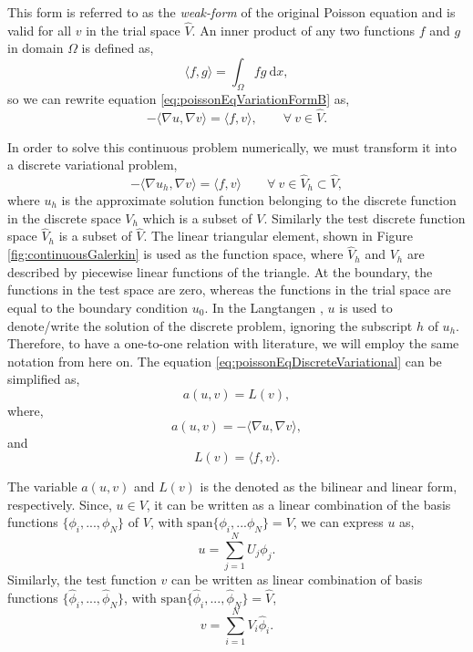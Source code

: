 This form is referred to as the \textit{weak-form} of the original Poisson equation and is valid for all $v$ in the trial space $\hat{V}$. An inner product of any two functions $f$ and $g$ in domain $\Omega$ is defined as,
	\begin{equation}
	\langle f,g \rangle = \int_{\Omega}fg\ \mathrm{d}x,
	\label{eq:innerProductRule}
	\end{equation}
so we can rewrite equation \ref{eq:poissonEqVariationFormB} as,
	\begin{equation}
	-\langle \nabla u,\nabla v \rangle = \langle f,v \rangle, \qquad \forall\ v \in \hat{V}.
	\end{equation}

In order to solve this continuous problem numerically, we must transform it into a discrete variational problem,
	\begin{equation}
	-\langle \nabla u_h, \nabla v \rangle = \langle f, v \rangle \qquad \forall\ v \in \hat{V}_h \subset \hat{V},
	\label{eq:poissonEqDiscreteVariational}
	\end{equation}
where $u_h$ is the approximate solution function belonging to the discrete function in the discrete space $V_h$ which is a subset of $V$. Similarly the test discrete function space $\hat{V}_h$ is a subset of $\hat{V}$. The linear triangular element, shown in Figure \ref{fig:continuousGalerkin} is used as the function space, where $\hat{V}_h$ and $V_h$ are described by piecewise linear functions of the triangle. At the boundary, the functions in the test space are zero, whereas the functions in the trial space are equal to the boundary condition $u_0$. In the Langtangen \cite{Logg2012b}, $u$ is used to denote/write the solution of the discrete problem, ignoring the subscript $h$ of $u_h$. Therefore, to have a one-to-one relation with literature, we will employ the same notation from here on. The equation \ref{eq:poissonEqDiscreteVariational} can be simplified as,
	\begin{equation}
	a\left(u,v\right) = L(v),
	\label{eq:weakForm}
	\end{equation}
where,
	\begin{equation}
	a\left(u,v\right) = - \langle \nabla u, \nabla v \rangle,
	\end{equation}
and
	\begin{equation}
	L(v) = \langle f,v \rangle.
	\end{equation}

The variable $a(u,v)$ and $L(v)$ is the denoted as the bilinear and linear form, respectively. Since, $u\in V$, it can be written as a linear combination of the basis functions $\{\phi_i,...,\phi_N\}$ of $V$, with $\mathrm{span}\{\phi_i,...\phi_N\}=V$, we can express $u$ as,
	\begin{equation}
	u = \sum_{j=1}^{N} U_j \phi_j.
	\label{eq:trialDiscrete}
	\end{equation}
Similarly, the test function $v$ can be written as linear combination of basis functions $\{\hat{\phi}_i,...,\hat{\phi}_N\}$, with $\mathrm{span}\{\hat{\phi}_i,...,\hat{\phi}_N\}=\hat{V}$, 
	\begin{equation}
	v=\sum_{i=1}^{N} V_i \hat{\phi}_i.
	\label{eq:testDiscrete}
	\end{equation}
		

